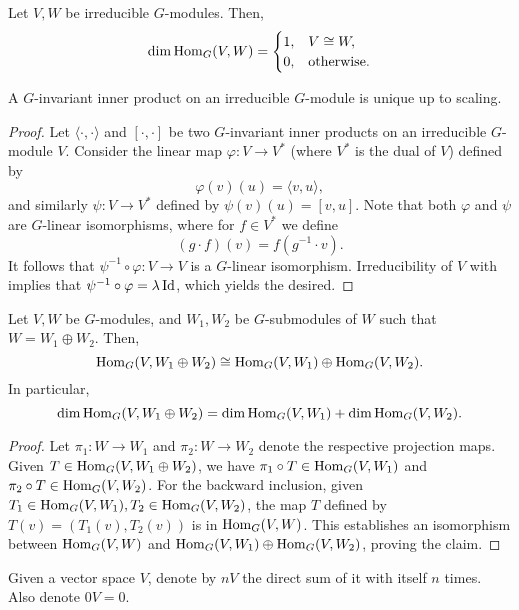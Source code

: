 	\begin{fcor}
		Let $V,W$ be irreducible $G$-modules. Then,
		\[ \dim \operatorname{Hom}_G(V,W) = \begin{cases} 1, & V \cong W, \\ 0, & \text{otherwise.} \end{cases} \]
	\end{fcor}

	\begin{fcor}
		\label{irred-unique-inner-prod}
		A $G$-invariant inner product on an irreducible $G$-module is unique up to scaling.
	\end{fcor}
	\begin{proof}
		Let $\langle\cdot,\cdot\rangle$ and $[\cdot,\cdot]$ be two $G$-invariant inner products on an irreducible $G$-module $V$.
		Consider the linear map $\varphi : V \to V^*$ (where $V^*$ is the dual of $V$) defined by
		\[ \varphi(v)(u) = \langle v,u\rangle, \]
		and similarly $\psi : V \to V^*$ defined by $\psi(v)(u) = [v,u]$. Note that both $\varphi$ and $\psi$ are $G$-linear isomorphisms, where for $f \in V^*$ we define
		\[ (g \cdot f)(v) = f(g^{-1} \cdot v). \]
		It follows that $\psi^{-1} \circ \varphi : V \to V$ is a $G$-linear isomorphism. Irreducibility of $V$ with  implies that $\psi^{-1} \circ \varphi = \lambda \operatorname{Id}$, which yields the desired.
	\end{proof}

	\begin{flem}
		Let $V,W$ be $G$-modules, and $W_1,W_2$ be $G$-submodules of $W$ such that $W = W_1 \oplus W_2$. Then,
		\[ \operatorname{Hom}_G(V,W_1\oplus W_2) \cong \operatorname{Hom}_G(V,W_1) \oplus \operatorname{Hom}_G(V,W_2). \]
		In particular,
		\[ \dim \operatorname{Hom}_G(V,W_1 \oplus W_2) = \dim \operatorname{Hom}_G(V,W_1) + \dim \operatorname{Hom}_G(V,W_2). \]
	\end{flem}
	\begin{proof}
		Let $\pi_1 : W \to W_1$ and $\pi_2 : W \to W_2$ denote the respective projection maps. Given $T \in \operatorname{Hom}_G(V,W_1\oplus W_2)$, we have $\pi_1 \circ T \in \operatorname{Hom}_G(V,W_1)$ and $\pi_2 \circ T \in \operatorname{Hom}_G(V,W_2)$. For the backward inclusion, given $T_1 \in \operatorname{Hom}_G(V,W_1), T_2 \in \operatorname{Hom}_G(V,W_2)$, the map $T$ defined by $T(v) = (T_1(v),T_2(v))$ is in $\operatorname{Hom}_G(V,W)$. This establishes an isomorphism between $\operatorname{Hom}_G(V,W)$ and $\operatorname{Hom}_G(V,W_1) \oplus \operatorname{Hom}_G(V,W_2)$, proving the claim.
	\end{proof}

	Given a vector space $V$, denote by $nV$ the direct sum of it with itself $n$ times. Also denote $0V = 0$.

